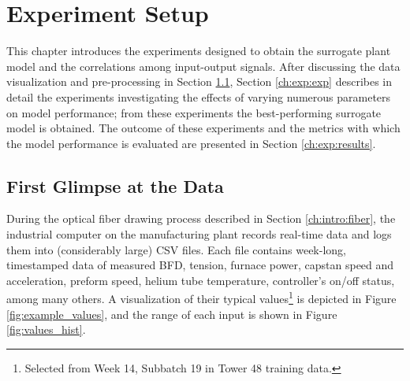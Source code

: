\chapter{Experiment Setup} \label{ch:exp}

This chapter introduces the experiments designed to obtain the surrogate plant model and the correlations among input-output signals. After discussing the data visualization and pre-processing in Section \ref{ch:exp:data}, Section \ref{ch:exp:exp} describes in detail the experiments investigating the effects of varying numerous parameters on model performance; from these experiments the best-performing surrogate model is obtained. The outcome of these experiments and the metrics with which the model performance is evaluated are presented in Section \ref{ch:exp:results}. 

\section{First Glimpse at the Data} \label{ch:exp:data}

During the optical fiber drawing process described in Section \ref{ch:intro:fiber}, the industrial computer on the manufacturing plant records real-time data and logs them into (considerably large) CSV files. Each file contains week-long, timestamped data of measured BFD, tension, furnace power, capstan speed and acceleration, preform speed, helium tube temperature, controller's on/off status, among many others. A visualization of their typical values\footnote{Selected from Week 14, Subbatch 19 in Tower 48 training data.} is depicted in Figure \ref{fig:example_values}, and the range of each input is shown in Figure \ref{fig:values_hist}.

